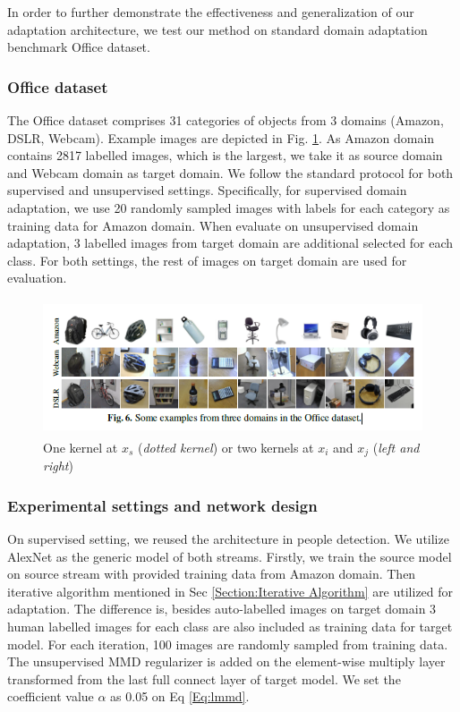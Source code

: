 \documentclass[runningheads]{llncs}
\begin{document}
In order to further demonstrate the effectiveness and generalization of our adaptation architecture, we test our method on standard domain adaptation benchmark Office dataset\cite{saenko2010adapting}.

\subsubsection{Office dataset}
The Office dataset comprises 31 categories of objects from 3 domains (Amazon, DSLR, Webcam). Example images are depicted in Fig. \ref{fig:officeimages}. As Amazon domain contains 2817 labelled images, which is the largest, we take it as source domain and Webcam domain as target domain. We follow the standard protocol for both supervised and unsupervised settings. Specifically, for supervised domain adaptation, we use 20 randomly sampled images with labels for each category as training data for Amazon domain. When evaluate on unsupervised domain adaptation, 3 labelled images from target domain are additional selected for each class. For both settings, the rest of images on target domain are used for evaluation.

\begin{figure}
\centering
\includegraphics[height=4cm]{images/officeimages.png}
\caption{One kernel at $x_s$ ({\it dotted kernel}) or two kernels at
$x_i$ and $x_j$ ({\it left and right}) }
\label{fig:officeimages}
\end{figure}

\subsubsection{Experimental settings and network design}
On supervised setting, we reused the architecture in people detection. We utilize AlexNet \cite{krizhevsky2012imagenet} as the generic model of both streams. Firstly, we train the source model on source stream with provided training data from Amazon domain. Then iterative algorithm mentioned in Sec \ref{Section:Iterative Algorithm} are utilized for adaptation. The difference is, besides auto-labelled images on target domain 3 human labelled images for each class are also included as training data for target model. For each iteration, 100 images are randomly sampled from training data. The unsupervised MMD regularizer is added on the element-wise multiply layer transformed from the last full connect layer of target model. We set the coefficient value $\alpha$ as 0.05 on Eq \ref{Eq:lmmd}.
\end{document}
